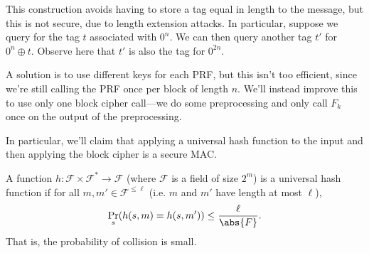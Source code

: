 \documentclass[12pt]{tufte-book}
\begin{document}
\begin{center}
\end{center}

This construction avoids having to store a tag equal in length to the message, but this is not secure, due to length extension attacks. In particular, suppose we query for the tag $t$ associated with $0^n$. We can then query another tag $t'$ for $0^n \oplus t$. Observe here that $t'$ is also the tag for $0^{2n}$.

A solution is to use different keys for each PRF, but this isn't too efficient, since we're still calling the PRF once per block of length $n$. We'll instead improve this to use only one block cipher call---we do some preprocessing and only call $F_k$ once on the output of the preprocessing.

In particular, we'll claim that applying a universal hash function to the input and then applying the block cipher is a secure MAC.

\begin{definition}
    A function $h : \mathcal{F} \times \mathcal{F}^* \to \mathcal{F}$ (where $\mathcal{F}$ is a field of size $2^m$) is a universal hash function if for all $m, m' \in \mathcal{F}^{\le \ell}$ (i.e. $m$ and $m'$ have length at most $\ell$),
    \[
        \Pr_s(h(s, m) = h(s, m')) \le \frac{\ell}{\abs{F}}
    .\]
    That is, the probability of collision is small.
\end{definition}
\end{document}
